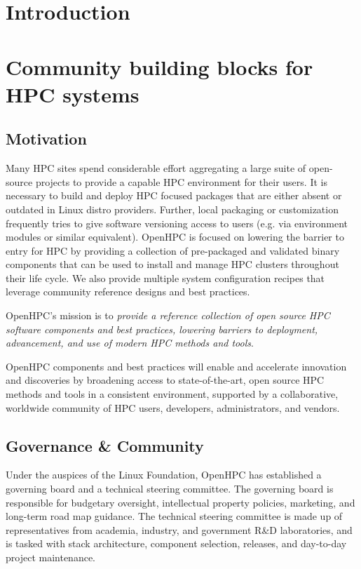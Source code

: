 \documentclass{sig-alternate-05-2015}
\begin{document}
%
%
\printccsdesc


\section{Introduction}


\section{Community building blocks for HPC systems}

\subsection{Motivation}
Many HPC sites spend considerable effort aggregating a large suite of 
open-source projects to provide a capable HPC environment for their users.
It is necessary to build and deploy HPC focused packages that are either absent
or outdated in Linux distro providers. Further, local packaging or 
customization frequently tries to give software versioning access to users (e.g.
via environment modules or similar equivalent). OpenHPC is focused on 
lowering the barrier to entry for HPC by providing a collection of 
pre-packaged and validated binary components that can be used to install 
and manage HPC clusters throughout their life cycle. We also provide multiple 
system configuration recipes that leverage community reference designs and best 
practices.

OpenHPC's mission is to {\em provide a reference collection of open source HPC
software components and best practices, lowering barriers to deployment,
advancement, and use of modern HPC methods and tools}.

OpenHPC components and best practices will enable and accelerate innovation and
discoveries by broadening access to state-of-the-art, open source HPC methods
and tools in a consistent environment, supported by a collaborative, worldwide
community of HPC users, developers, administrators, and vendors.



\subsection{Governance \& Community}
Under the auspices of the Linux Foundation, OpenHPC has established a governing
board and a technical steering committee. The governing board is responsible for
budgetary oversight, intellectual property policies, marketing, and long-term
road map guidance. The technical steering committee is made up of representatives
from academia, industry, and government R\&D laboratories, and is tasked with
stack architecture, component selection, releases, and day-to-day project
maintenance.
\end{document}
